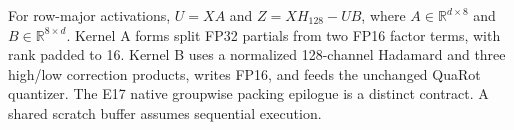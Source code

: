 For row-major activations, $U=XA$ and $Z=XH_{128}-UB$, where $A\in\mathbb{R}^{d\times8}$ and $B\in\mathbb{R}^{8\times d}$. Kernel A forms split FP32 partials from two FP16 factor terms, with rank padded to 16. Kernel B uses a normalized 128-channel Hadamard and three high/low correction products, writes FP16, and feeds the unchanged QuaRot quantizer. The E17 native groupwise packing epilogue is a distinct contract. A shared scratch buffer assumes sequential execution.
